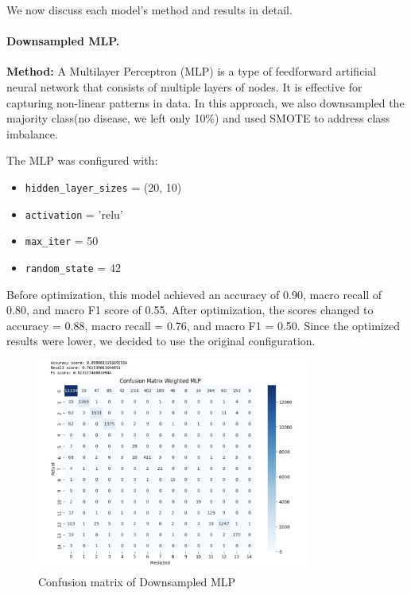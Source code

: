 \documentclass[a4paper,12pt]{article}
\begin{document}
\vspace{1em}

We now discuss each model's method and results in detail.

\paragraph{Downsampled MLP.}
\textbf{Method:} A Multilayer Perceptron (MLP) is a type of feedforward artificial neural network that consists of multiple layers of nodes. It is effective for capturing non-linear patterns in data. In this approach, we also downsampled the majority class(no disease, we left only 10\%) and used SMOTE to address class imbalance.

The MLP was configured with:
\begin{itemize}
    \item \texttt{hidden\_layer\_sizes} = (20, 10)
    \item \texttt{activation} = 'relu'
    \item \texttt{max\_iter} = 50
    \item \texttt{random\_state} = 42
\end{itemize}
Before optimization, this model achieved an accuracy of 0.90, macro recall of 0.80, and macro F1 score of 0.55. After optimization, the scores changed to accuracy = 0.88, macro recall = 0.76, and macro F1 = 0.50. Since the optimized results were lower, we decided to use the original configuration.

\begin{figure}[H]
    \centering
    \includegraphics[width=0.8\textwidth]{Figs/conf_mat_downsamp.png}
    \caption{Confusion matrix of Downsampled MLP}
    \label{fig:conf_mat_downsamp}
\end{figure}
\end{document}
